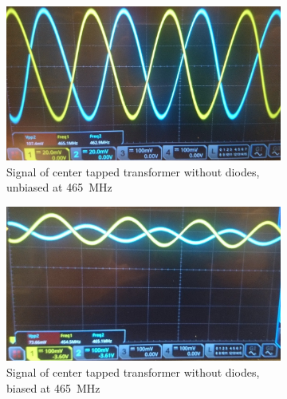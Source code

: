 \begin{figure}
	\centering
	\begin{subfigure}{0.4\textwidth}
		\centering
		\includegraphics[width=\textwidth]{Chapters/Deflection/unbiased3}
		\caption{Signal of center tapped transformer without diodes, unbiased at \SI{465}{\mega\hertz}}
		\label{fig:unbiased2}
	\end{subfigure}
	\hspace{0.1\textwidth}
	\begin{subfigure}{0.4\textwidth}
		\centering
		\includegraphics[width=\textwidth]{Chapters/Deflection/biased3}
		\caption{Signal of center tapped transformer without diodes, biased at \SI{465}{\mega\hertz}}
		\label{fig:biased2}
	\end{subfigure}
	\caption{}
	\label{fig:CTTSignal}
\end{figure}



